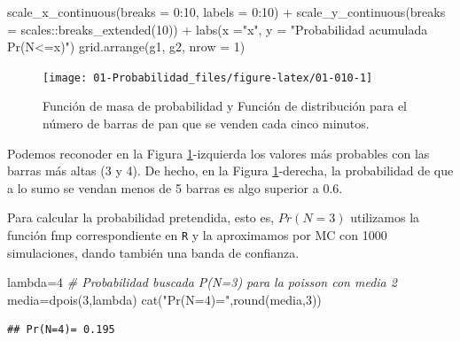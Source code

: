 \documentclass[
]{book}
\newenvironment{Shaded}{\begin{snugshade}}{\end{snugshade}}
\newcommand{\AttributeTok}[1]{\textcolor[rgb]{0.77,0.63,0.00}{#1}}
\newcommand{\CommentTok}[1]{\textcolor[rgb]{0.56,0.35,0.01}{\textit{#1}}}
\newcommand{\DecValTok}[1]{\textcolor[rgb]{0.00,0.00,0.81}{#1}}
\newcommand{\FunctionTok}[1]{\textcolor[rgb]{0.00,0.00,0.00}{#1}}
\newcommand{\NormalTok}[1]{#1}
\newcommand{\OtherTok}[1]{\textcolor[rgb]{0.56,0.35,0.01}{#1}}
\newcommand{\SpecialCharTok}[1]{\textcolor[rgb]{0.00,0.00,0.00}{#1}}
\newcommand{\StringTok}[1]{\textcolor[rgb]{0.31,0.60,0.02}{#1}}
\theoremstyle{definition}
\theoremstyle{definition}
\theoremstyle{definition}
\theoremstyle{definition}
\theoremstyle{remark}
\begin{document}
\begin{Shaded}
\begin{Highlighting}[]
  \FunctionTok{scale\_x\_continuous}\NormalTok{(}\AttributeTok{breaks =} \DecValTok{0}\SpecialCharTok{:}\DecValTok{10}\NormalTok{, }\AttributeTok{labels =} \DecValTok{0}\SpecialCharTok{:}\DecValTok{10}\NormalTok{) }\SpecialCharTok{+}
  \FunctionTok{scale\_y\_continuous}\NormalTok{(}\AttributeTok{breaks =}\NormalTok{ scales}\SpecialCharTok{::}\FunctionTok{breaks\_extended}\NormalTok{(}\DecValTok{10}\NormalTok{)) }\SpecialCharTok{+}
  \FunctionTok{labs}\NormalTok{(}\AttributeTok{x =}\StringTok{"x"}\NormalTok{, }\AttributeTok{y =} \StringTok{"Probabilidad acumulada Pr(N\textless{}=x)"}\NormalTok{)}
\FunctionTok{grid.arrange}\NormalTok{(g1, g2, }\AttributeTok{nrow =} \DecValTok{1}\NormalTok{)}
\end{Highlighting}
\end{Shaded}

\begin{figure}

{\centering \texttt{[image: 01-Probabilidad\_files/figure-latex/01-010-1]} 

}

\caption{Función de masa de probabilidad y Función de distribución para el número de barras de pan que se venden cada cinco minutos.}\label{fig:01-010}
\end{figure}

Podemos reconoder en la Figura \ref{fig:01-010}-izquierda los valores más probables con las barras más altas (3 y 4). De hecho, en la Figura \ref{fig:01-010}-derecha, la probabilidad de que a lo sumo se vendan menos de 5 barras es algo superior a 0.6.

Para calcular la probabilidad pretendida, esto es, \(Pr(N=3)\) utilizamos la función fmp correspondiente en \texttt{R} y la aproximamos por MC con 1000 simulaciones, dando también una banda de confianza.

\begin{Shaded}
\begin{Highlighting}[]
\NormalTok{lambda}\OtherTok{=}\DecValTok{4}
\CommentTok{\# Probabilidad buscada P(N=3) para la poisson con media 2}
\NormalTok{media}\OtherTok{=}\FunctionTok{dpois}\NormalTok{(}\DecValTok{3}\NormalTok{,lambda)}
\FunctionTok{cat}\NormalTok{(}\StringTok{"Pr(N=4)="}\NormalTok{,}\FunctionTok{round}\NormalTok{(media,}\DecValTok{3}\NormalTok{))}
\end{Highlighting}
\end{Shaded}

\begin{verbatim}
## Pr(N=4)= 0.195
\end{verbatim}
\end{document}

